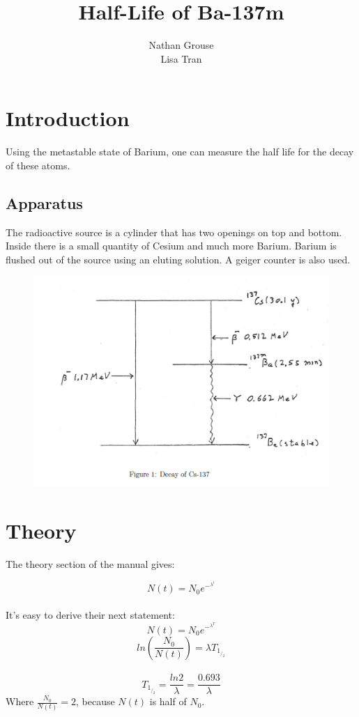 \documentclass[12pt]{article}
\title{Half-Life of Ba-137m}
\author{Nathan Grouse\\Lisa Tran}
\begin{document}
\maketitle

\section{Introduction}
\indent \indent Using the metastable state of Barium, one can measure the half life for the decay of these atoms.

\subsection{Apparatus}
\indent \indent The radioactive source is a cylinder that has two openings on top and bottom. Inside there is a small quantity of Cesium and much more Barium. Barium is flushed out of the source using an eluting solution. A geiger counter is also used.

\begin{figure}[H]
\centering
\hspace{-0.0in}\includegraphics[scale=0.90]{apparatus.png}
\end{figure}

\section{Theory}
\indent \indent The theory section of the manual gives:

\[ N(t) = N_0e^-^\lambda ^t \] \\
\indent It's easy to derive their next statement:
\[ N(t) =  N_0e^-^\lambda ^T \]
\[ ln(\frac{N_0}{N(t)}) = \lambda T_1_/_2 \] \\
\[ T_1_/_2 = \frac{ln2}{\lambda} = \frac{0.693}{\lambda} \]
\indent Where $\frac{N_0}{N(t)} = 2 $, because $N(t)$ is half of $N_0$.
\end{document}
